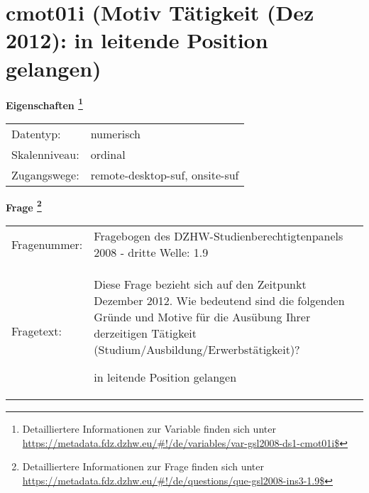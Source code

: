 
    \setcounter{footnote}{0}

    \vspace*{-1.8cm}
	\section{cmot01i (Motiv Tätigkeit (Dez 2012): in leitende Position gelangen)}
	\label{section:cmot01i}



    \vspace*{0.5cm}
    \noindent\textbf{Eigenschaften
	\footnote{Detailliertere Informationen zur Variable finden sich unter
		\url{https://metadata.fdz.dzhw.eu/\#!/de/variables/var-gsl2008-ds1-cmot01i$}}}\\
	\begin{tabularx}{\hsize}{@{}lX}
	Datentyp: & numerisch \\
	Skalenniveau: & ordinal \\
	Zugangswege: &
	  remote-desktop-suf, 
	  onsite-suf
 \\
    \end{tabularx}



				\vspace*{0.5cm}
                \noindent\textbf{Frage
	                \footnote{Detailliertere Informationen zur Frage finden sich unter
		              \url{https://metadata.fdz.dzhw.eu/\#!/de/questions/que-gsl2008-ins3-1.9$}}}\\
				\begin{tabularx}{\hsize}{@{}lX}
					Fragenummer: &
					  Fragebogen des DZHW-Studienberechtigtenpanels 2008 - dritte Welle:
					  1.9
 \\
					Fragetext: & Diese Frage bezieht sich auf den Zeitpunkt Dezember 2012. Wie bedeutend sind die folgenden Gründe und Motive für die Ausübung Ihrer derzeitigen Tätigkeit (Studium/Ausbildung/Erwerbstätigkeit)?\par  in leitende Position gelangen \\
				\end{tabularx}





